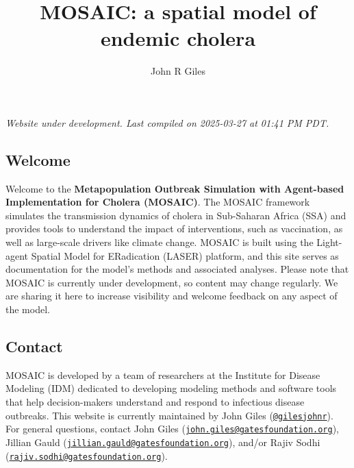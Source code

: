 \documentclass[
]{book}
\title{MOSAIC: a spatial model of endemic cholera}
\author{John R Giles}
\date{}
\begin{document}
\maketitle

{
\setcounter{tocdepth}{1}
\tableofcontents
}
\chapter*{}\label{section}

\hfill\break

{\emph{
Website under development. Last compiled on 2025-03-27 at 01:41 PM PDT.
}}

\section*{Welcome}\label{welcome}

Welcome to the \textbf{Metapopulation Outbreak Simulation with Agent-based Implementation for Cholera (MOSAIC)}. The MOSAIC framework simulates the transmission dynamics of cholera in Sub-Saharan Africa (SSA) and provides tools to understand the impact of interventions, such as vaccination, as well as large-scale drivers like climate change. MOSAIC is built using the Light-agent Spatial Model for ERadication (LASER) platform, and this site serves as documentation for the model's methods and associated analyses. Please note that MOSAIC is currently under development, so content may change regularly. We are sharing it here to increase visibility and welcome feedback on any aspect of the model.

\section*{Contact}\label{contact}

MOSAIC is developed by a team of researchers at the Institute for Disease Modeling (IDM) dedicated to developing modeling methods and software tools that help decision-makers understand and respond to infectious disease outbreaks. This website is currently maintained by John Giles (\href{https://github.com/gilesjohnr}{\texttt{@gilesjohnr}}). For general questions, contact John Giles (\href{mailto:john.giles@gatesfoundation.org}{\nolinkurl{john.giles@gatesfoundation.org}}), Jillian Gauld (\href{mailto:jillian.gauld@gatesfoundation.org}{\nolinkurl{jillian.gauld@gatesfoundation.org}}), and/or Rajiv Sodhi (\href{mailto:rajiv.sodhi@gatesfoundation.org}{\nolinkurl{rajiv.sodhi@gatesfoundation.org}}).
\end{document}
